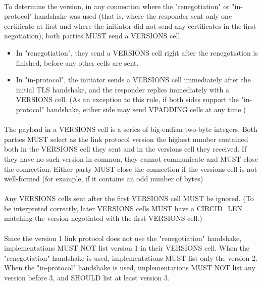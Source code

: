 \paragraph{}
To determine the version, in any connection where the "renegotiation"
or "in-protocol" handshake was used (that is, where the responder
sent only one certificate at first and where the initiator did not
send any certificates in the first negotiation), both parties MUST
send a VERSIONS cell.
\begin{itemize}
    \item
    In "renegotiation", they send a VERSIONS cell
    right after the renegotiation is finished, before any other cells are
    sent.
    \item In "in-protocol", the initiator sends a VERSIONS cell
    immediately after the initial TLS handshake, and the responder
    replies immediately with a VERSIONS cell. (As an exception to this rule,
    if both sides support the "in-protocol" handshake, either side may send
    VPADDING cells at any time.)
\end{itemize}

\paragraph{}
The payload in a VERSIONS cell is a series of big-endian two-byte
integers. Both parties MUST select as the link protocol version the
highest number contained both in the VERSIONS cell they sent and in the
versions cell they received. If they have no such version in common,
they cannot communicate and MUST close the connection. Either party MUST
close the connection if the versions cell is not well-formed (for example,
if it contains an odd number of bytes)

\paragraph{}
Any VERSIONS cells sent after the first VERSIONS cell MUST be ignored.
(To be interpreted correctly, later VERSIONS cells MUST have a CIRCID\_LEN
matching the version negotiated with the first VERSIONS cell.)


\paragraph{}
Since the version 1 link protocol does not use the "renegotiation"
handshake, implementations MUST NOT list version 1 in their VERSIONS
cell. When the "renegotiation" handshake is used, implementations
MUST list only the version 2. When the "in-protocol" handshake is
used, implementations MUST NOT list any version before 3, and SHOULD
list at least version 3.

